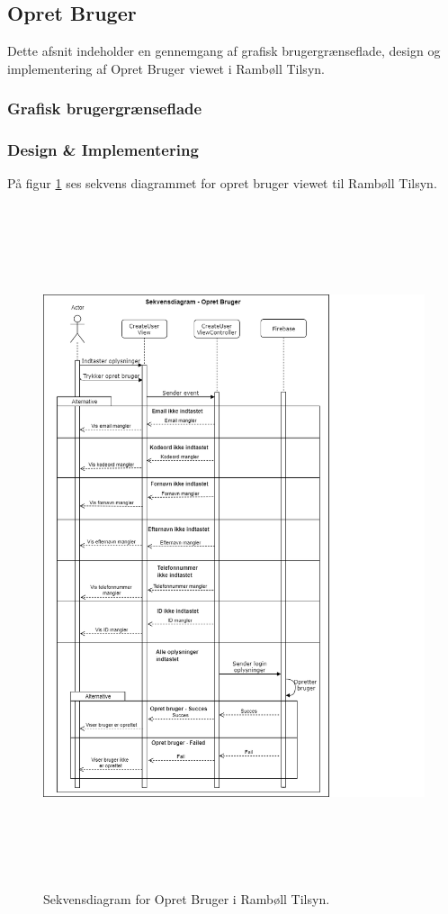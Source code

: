 \subsection{Opret Bruger}
Dette afsnit indeholder en gennemgang af grafisk brugergrænseflade, design og implementering af Opret Bruger viewet i Rambøll Tilsyn.

\subsubsection{Grafisk brugergrænseflade}

\subsubsection{Design \& Implementering}
På figur \ref{fig:OpretBrugerSekvens} ses sekvens diagrammet for opret bruger viewet til Rambøll Tilsyn.
\begin{figure}[H] %
	\centering
	\includegraphics[height=20cm, width=15cm]{../ArkitekturDesign/Design/OpretBruger/OpretBrugerSekvensDiagram}
	\caption{Sekvensdiagram for Opret Bruger i Rambøll Tilsyn.}
	\label{fig:OpretBrugerSekvens}
\end{figure}

\clearpage
